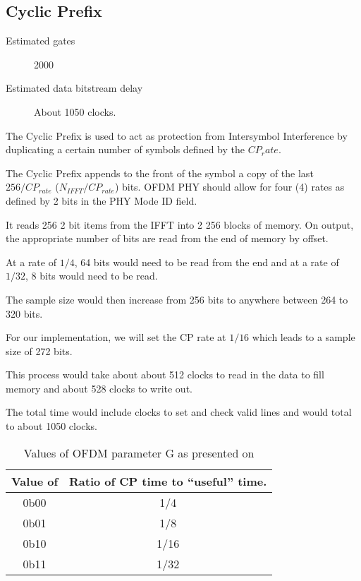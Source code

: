 

\subsection{Cyclic Prefix}
\label{sec:cyclic_prefix}
\begin{description}
	\item[Estimated gates] 2000
	\item[Estimated data bitstream delay] About 1050 clocks.
\end{description}

The Cyclic Prefix is used to act as protection from Intersymbol Interference 
by duplicating a certain number of symbols defined by the $CP_rate$.

The Cyclic Prefix appends to the front of the symbol a copy of the last
$256/CP_{rate}$ ($N_{IFFT}/CP_{rate}$) bits. OFDM PHY should allow for four
(4) rates as defined by 2 bits in the PHY Mode ID field. 

It reads 256 2 bit items from the IFFT into 2 256 blocks of memory.
On output, the appropriate number of bits are read from the end of 
memory by offset.

At a rate of $1/4$, 64 bits would need to be read from the end and 
at a rate of $1/32$, 8 bits would need to be read.

The sample size would then increase from 256 bits to anywhere between
264 to 320 bits.

For our implementation, we will set the CP rate at $1/16$ which leads to
a sample size of 272 bits.

This process would take about about 512 clocks to read in the data to fill
memory and about 528 clocks to write out. 

The total time would include clocks to set and check valid lines and would
total to about 1050 clocks. 

\begin{table}
	\begin{tabulary}{\linewidth}{C|C}
		Value of  & Ratio of CP time to ``useful'' time. \\ \hline
		0b00 & 1/4 \\
		0b01 & 1/8 \\
		0b10 & 1/16 \\
		0b11 & 1/32
	\end{tabulary}
	\caption{Values of OFDM parameter G as presented on }
	\label{tbl:param-g-vals}
\end{table}

